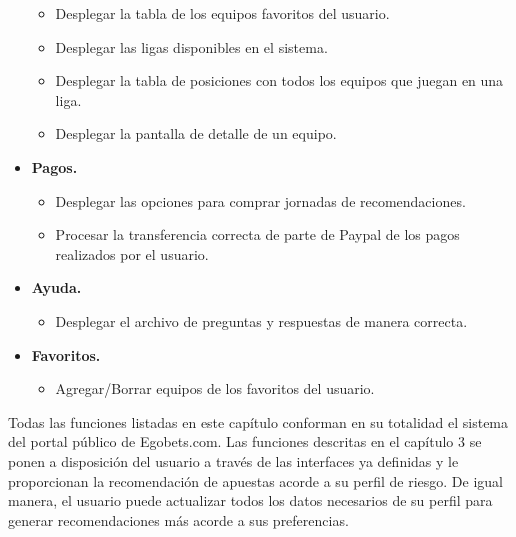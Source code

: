 \begin{itemize}
			\begin{itemize}
				\item Desplegar la tabla de los equipos favoritos del usuario.
				\item Desplegar las ligas disponibles en el sistema.
				\item Desplegar la tabla de posiciones con todos los equipos que juegan en una liga.
				\item Desplegar la pantalla de detalle de un equipo.
			\end{itemize}
			\item \textbf{Pagos.}
			\begin{itemize}
				\item Desplegar las opciones para comprar jornadas de recomendaciones.
				\item Procesar la transferencia correcta de parte de Paypal de los pagos realizados por el usuario.
			\end{itemize}
			\item \textbf{Ayuda.}
			\begin{itemize}
				\item Desplegar el archivo de preguntas y respuestas de manera correcta.
			\end{itemize}
			\item \textbf{Favoritos.}
			\begin{itemize}
				\item Agregar/Borrar equipos de los favoritos del usuario.
			\end{itemize}

		\end{itemize}


Todas las funciones listadas en este capítulo conforman en su totalidad el sistema del portal público de Egobets.com. Las funciones descritas en el capítulo 3 se ponen a disposición del usuario a través de las interfaces ya definidas y le proporcionan la recomendación de apuestas acorde a su perfil de riesgo. De igual manera, el usuario puede actualizar todos los datos necesarios de su perfil para generar recomendaciones más acorde a sus preferencias.

